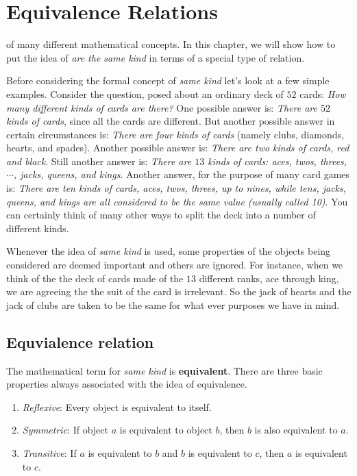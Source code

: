 \chapter{Equivalence Relations}

 of many different mathematical concepts. 
 In this chapter, we will show how to put the idea of {\itshape
are the same kind} in terms of a special type of relation.

  Before considering the formal concept of {\itshape same kind} let's look at a few
simple examples. Consider the question, posed about an ordinary deck of $52$
cards: {\itshape How many different kinds of cards are there?} One possible answer is:
{\itshape There are $52$ kinds of cards}, since all the cards are different. But
another possible answer in certain circumstances is: {\itshape There are four kinds of
cards} (namely clubs, diamonds, hearts, and spades). Another possible answer is:
{\itshape There are two kinds of cards, red and black}. Still another answer is: {\it
There are $13$ kinds of cards: aces, twos, threes, $\cdots$, jacks, queens, and
kings}. Another answer, for the purpose of many card games is: {\itshape There are ten
kinds of cards, aces, twos, threes, up to nines, while tens, jacks, queens, and kings
are all considered to be the same value (usually called 10)}. You can certainly
think of many other ways to split the deck into a number of different kinds.

  Whenever the idea of {\itshape same kind} is used, some properties of the objects
being considered are deemed important and others are ignored. For instance, when
we think of the the deck of cards made of the $13$ different ranks, ace through
king, we are agreeing the the suit of the card is irrelevant. So the jack of
hearts and the jack of clubs are taken to be the same for what ever purposes we
have in mind.

\section{Equvialence relation}
  The mathematical term for {\itshape same kind} is {\bfseries equivalent}. There are
three basic properties always associated with the idea of equivalence.
\begin{enumerate}
 \item \emph{Reflexive}: Every object is equivalent to itself.
 \item \emph{Symmetric}: If object $a$  is equivalent to object $b$, then $b$ is
 also equivalent to $a$.
 \item \emph{Transitive}: If $a$ is equivalent to $b$ and $b$ is equivalent to
 $c$, then $a$ is equivalent to $c$.
\end{enumerate}


